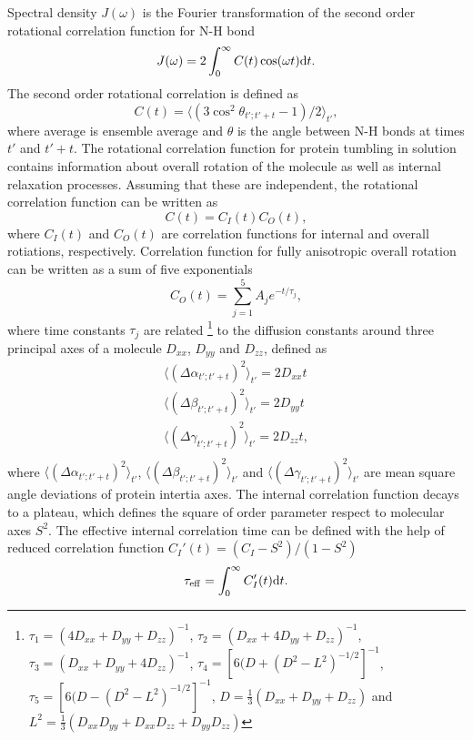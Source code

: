 \documentclass[pre,aps,floatfix,authordate1-4,twocolumn]{revtex4-1}
\begin{document}
Spectral density $J(\omega)$ is the Fourier transformation of the second order
rotational correlation function for N-H bond
\begin{equation}\label{SPECTdens}
  J(\omega)=2\int_0^\infty C(t) \cos(\omega t) {\rm d}t.
\end{equation}
The second order rotational correlation is defined as
\begin{equation}\label{CORRFdef}
  C(t)=\langle (3\cos^2\theta_{t';t'+t}-1)/2 \rangle_{t'},
\end{equation}
where average is ensemble average and $\theta$ is the angle between N-H bonds at times $t'$ and $t'+t$.
The rotational correlation function for protein tumbling in solution
contains information about overall rotation of the molecule as well as
internal relaxation processes. Assuming that these are independent,
the rotational correlation function can be written as \cite{??}
\begin{equation}\label{CORRFsep}
  C(t)=C_I(t)C_O(t),
\end{equation}
where $C_I(t)$ and $C_O(t)$ are correlation functions for internal and overall
rotiations, respectively. Correlation function for fully anisotropic overall
rotation can be written as a sum of five exponentials \cite{??}
\begin{equation}\label{CORRFanisot}
  C_O(t)=\sum_{j=1}^5 A_j e^{-t/\tau_j},
\end{equation}
where time constants $\tau_j$ are related \footnote{
$\tau_1=(4D_{xx}+D_{yy}+D_{zz})^{-1}$,
$\tau_2=(D_{xx}+4D_{yy}+D_{zz})^{-1}$,
$\tau_3=(D_{xx}+D_{yy}+4D_{zz})^{-1}$,
$\tau_4=[6(D+(D^2-L^2)^{-1/2}]^{-1}$,
$\tau_5=[6(D-(D^2-L^2)^{-1/2}]^{-1}$,
$D=\frac{1}{3}(D_{xx}+D_{yy}+D_{zz})$ and 
$L^2=\frac{1}{3}(D_{xx}D_{yy}+D_{xx}D_{zz}+D_{yy}D_{zz})$} to
the diffusion constants around
three principal axes of a molecule
$D_{xx}$, $D_{yy}$ and $D_{zz}$,  
defined as 
\begin{equation}\label{DIFFdef}
  \begin{aligned}
    \langle (\Delta \alpha_{t';t'+t})^2 \rangle_{t'} = 2 D_{xx} t \\
    \langle (\Delta \beta_{t';t'+t})^2 \rangle_{t'} = 2 D_{yy} t \\
    \langle (\Delta \gamma_{t';t'+t})^2 \rangle_{t'} = 2 D_{zz} t, \\
  \end{aligned}
\end{equation}
where $\langle (\Delta \alpha_{t';t'+t})^2 \rangle_{t'}$,
$\langle (\Delta \beta_{t';t'+t})^2 \rangle_{t'}$ and
$\langle (\Delta \gamma_{t';t'+t})^2 \rangle_{t'}$ are mean
square angle deviations of protein intertia axes.
The internal correlation function decays to a plateau, which
defines the square of order parameter respect to molecular axes $S^2$.
The effective internal correlation time can be defined with the
help of reduced correlation function $C_I'(t)=(C_I-S^2)/(1-S^2)$ \cite{??}
\begin{equation}
  \tau_{\rm eff}=\int_0^\infty C_I'(t) \mathrm{d}t.
\end{equation}
\end{document}
